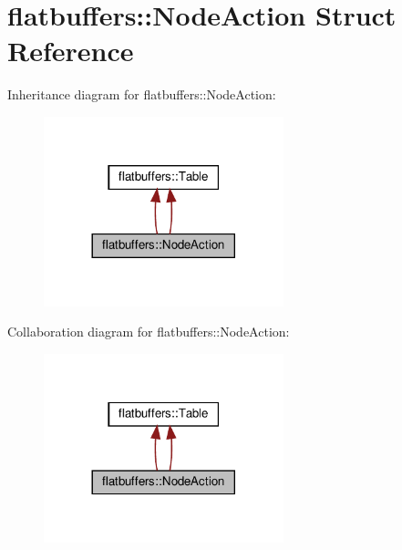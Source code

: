 \hypertarget{structflatbuffers_1_1NodeAction}{}\section{flatbuffers\+:\+:Node\+Action Struct Reference}
\label{structflatbuffers_1_1NodeAction}


Inheritance diagram for flatbuffers\+:\+:Node\+Action\+:
\nopagebreak
\begin{figure}[H]
\begin{center}
\leavevmode
\includegraphics[width=197pt]{structflatbuffers_1_1NodeAction__inherit__graph}
\end{center}
\end{figure}


Collaboration diagram for flatbuffers\+:\+:Node\+Action\+:
\nopagebreak
\begin{figure}[H]
\begin{center}
\leavevmode
\includegraphics[width=197pt]{structflatbuffers_1_1NodeAction__coll__graph}
\end{center}
\end{figure}
